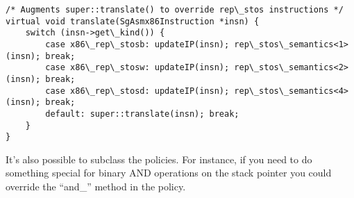 \begin{verbatim}
/* Augments super::translate() to override rep\_stos instructions */
virtual void translate(SgAsmx86Instruction *insn) {
    switch (insn->get\_kind()) {
        case x86\_rep\_stosb: updateIP(insn); rep\_stos\_semantics<1>(insn); break;
        case x86\_rep\_stosw: updateIP(insn); rep\_stos\_semantics<2>(insn); break;
        case x86\_rep\_stosd: updateIP(insn); rep\_stos\_semantics<4>(insn); break;
        default: super::translate(insn); break;
    }
}
\end{verbatim}

It's also possible to subclass the policies. For instance, if you need
to do something special for binary AND operations on the stack
pointer you could override the ``and\_'' method in the policy.
